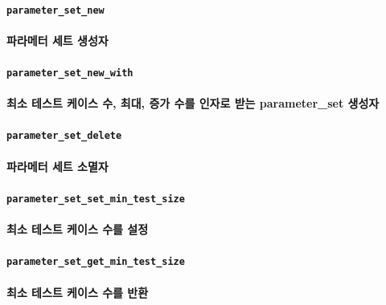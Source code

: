 \documentclass[UTF8, a4paper]{report}
\begin{document}
            \paragraph{\texttt{parameter\_set\_new}}
            \paragraph{%
                \normalfont 파라메터 세트 생성자
            }

            \paragraph{\texttt{parameter\_set\_new\_with}}
            \paragraph{%
                \normalfont 최소 테스트 케이스 수, 최대, 증가 수를 인자로 받는 parameter\_set 생성자
            }

            \paragraph{\texttt{parameter\_set\_delete}}
            \paragraph{%
                \normalfont 파라메터 세트 소멸자
            }

            \paragraph{\texttt{parameter\_set\_set\_min\_test\_size}}
            \paragraph{%
                \normalfont 최소 테스트 케이스 수를 설정
            }

            \paragraph{\texttt{parameter\_set\_get\_min\_test\_size}}
            \paragraph{%
                \normalfont 최소 테스트 케이스 수를 반환
            }
\end{document}
